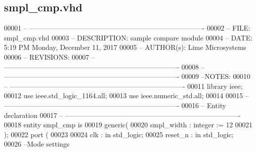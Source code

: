 \subsection{smpl\+\_\+cmp.\+vhd}
\label{smpl__cmp_8vhd_source}

\begin{DoxyCode}
00001 \textcolor{keyword}{-- ----------------------------------------------------------------------------}
00002 \textcolor{keyword}{-- FILE:          smpl\_cmp.vhd}
00003 \textcolor{keyword}{-- DESCRIPTION:   sample compare module  }
00004 \textcolor{keyword}{-- DATE:          5:19 PM Monday, December 11, 2017}
00005 \textcolor{keyword}{-- AUTHOR(s):     Lime Microsystems}
00006 \textcolor{keyword}{-- REVISIONS:}
00007 \textcolor{keyword}{-- ----------------------------------------------------------------------------}
00008 \textcolor{keyword}{-- ----------------------------------------------------------------------------}
00009 \textcolor{keyword}{--NOTES: }
00010 \textcolor{keyword}{-- ----------------------------------------------------------------------------}
00011 \textcolor{vhdlkeyword}{library }\textcolor{keywordflow}{ieee};
00012 \textcolor{vhdlkeyword}{use }ieee.std\_logic\_1164.\textcolor{keywordflow}{all};
00013 \textcolor{vhdlkeyword}{use }ieee.numeric\_std.\textcolor{keywordflow}{all};
00014 
00015 \textcolor{keyword}{-- ----------------------------------------------------------------------------}
00016 \textcolor{keyword}{-- Entity declaration}
00017 \textcolor{keyword}{-- ----------------------------------------------------------------------------}
00018 \textcolor{keywordflow}{entity }smpl_cmp \textcolor{keywordflow}{is}
00019    \textcolor{keywordflow}{generic}\textcolor{vhdlchar}{(}
00020       \textcolor{vhdlchar}{smpl_width}  \textcolor{vhdlchar}{:} \textcolor{comment}{integer} \textcolor{vhdlchar}{:=} \textcolor{vhdllogic}{}\textcolor{vhdllogic}{12}
00021    \textcolor{vhdlchar}{)};
00022    \textcolor{keywordflow}{port} \textcolor{vhdlchar}{(}
00023 
00024       \textcolor{vhdlchar}{clk}            \textcolor{vhdlchar}{:} \textcolor{keywordflow}{in} \textcolor{comment}{std\_logic};
00025       \textcolor{vhdlchar}{reset_n}        \textcolor{vhdlchar}{:} \textcolor{keywordflow}{in} \textcolor{comment}{std\_logic};
00026 \textcolor{keyword}{      --Mode settings}

\end{DoxyCode}
